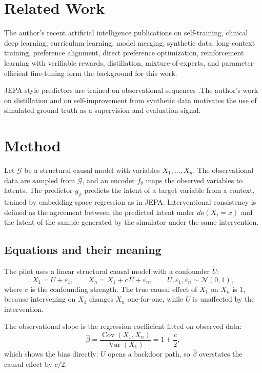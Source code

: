 \documentclass[conference]{IEEEtran}
\begin{document}
\section{Related Work}
The author's recent artificial intelligence publications on self-training, clinical deep learning, curriculum learning, model merging, synthetic data, long-context training, preference alignment, direct preference optimization, reinforcement learning with verifiable rewards, distillation, mixture-of-experts, and parameter-efficient fine-tuning \cite{d1selftraining,d2glaucoma,d3curriculum,d4merging,d5synthetic,d6longcontext,d7rlaif,d8distillation,d9moe,d10peft,d11dpo,d12rlvr} form the background for this work.

JEPA-style predictors are trained on observational sequences \cite{bardes2024vjepa}.The author's work on distillation \cite{d8distillation} and on self-improvement from synthetic data \cite{d5synthetic} motivates the use of simulated ground truth as a supervision and evaluation signal.

\section{Method}
Let $\mathcal{G}$ be a structural causal model with variables $X_1,\dots,X_n$. The observational data are sampled from $\mathcal{G}$, and an encoder $f_\theta$ maps the observed variables to latents. The predictor $g_\phi$ predicts the latent of a target variable from a context, trained by embedding-space regression as in JEPA. Interventional consistency is defined as the agreement between the predicted latent under $do(X_i = x)$ and the latent of the sample generated by the simulator under the same intervention.

\subsection*{Equations and their meaning}
The pilot uses a linear structural causal model with a confounder $U$:
\begin{equation}
X_1=U+\varepsilon_1,\qquad X_n=X_1+c\,U+\varepsilon_n,\qquad U,\varepsilon_1,\varepsilon_n\sim\mathcal{N}(0,1),
\end{equation}
where $c$ is the confounding strength. The true causal effect of $X_1$ on $X_n$ is $1$, because intervening on $X_1$ changes $X_n$ one-for-one, while $U$ is unaffected by the intervention.

The observational slope is the regression coefficient fitted on observed data:
\begin{equation}
\hat\beta=\frac{\operatorname{Cov}(X_1,X_n)}{\operatorname{Var}(X_1)}=1+\frac{c}{2},
\end{equation}
which shows the bias directly: $U$ opens a backdoor path, so $\hat\beta$ overstates the causal effect by $c/2$.
\end{document}
